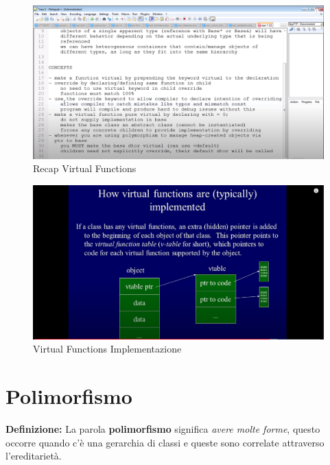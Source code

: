 \begin{figure}[H]
	\centering
	\includegraphics[width=1.2\textwidth, height=1.2\textheight, keepaspectratio]{./imgs/virtual_functions_recap_terminology_and_concepts2.png}
	\caption{Recap Virtual Functions}
	\label{fig:virtual_functions_recap_terminology_and_concepts2}
\end{figure}

\begin{figure}[H]
	\centering
	\includegraphics[width=1.2\textwidth, height=1.2\textheight, keepaspectratio]{./imgs/virtual_functions_implementation.png}
	\caption{Virtual Functions Implementazione}
	\label{fig:virtual_functions_implementation}
\end{figure}


\section{Polimorfismo}

\textsf{\small \textbf{Definizione:} La parola \textbf{polimorfismo} significa \emph{avere molte forme}, questo occorre quando c'è una gerarchia di classi e queste sono correlate attraverso l'ereditarietà.} \\

